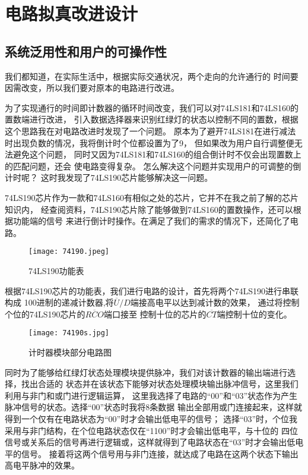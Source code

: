 \documentclass[AutoFakeBold]{LZUThesis}
\begin{document}
\chapter{电路拟真改进设计}
\section{系统泛用性和用户的可操作性}
我们都知道，在实际生活中，根据实际交通状况，两个走向的允许通行的
时间要因需改变，所以我们要对原本的电路进行改进。

为了实现通行的时间即计数器的循环时间改变，我们可以对74LS181和74LS160的置数端进行改进，
引入数据选择器来识别红绿灯的状态以控制不同的置数，根据这个思路我在对电路改进时发现了一个问题。
原本为了避开74LS181在进行减法时出现负数的情况，我将倒计时个位都设置为了9，
但如果改为用户自行调整便无法避免这个问题，
同时又因为74LS181和74LS160的组合倒计时不仅会出现置数上的匹配问题，还会
使电路变得复杂。
怎么解决这个问题并实现用户的可调整的倒计时呢？
这时我发现了74LS190芯片能够解决这一问题。

74LS190芯片作为一款和74LS160有相似之处的芯片，它并不在我之前了解的芯片知识内，
经查阅资料，74LS190芯片除了能够做到74LS160的置数操作，还可以根据功能端的信号
来进行倒计时操作。在满足了我们的需求的情况下，还简化了电路。

\begin{figure}[htbp]
    \centering
    \texttt{[image: 74190.jpeg]}
    \caption{74LS190功能表}
\end{figure}

根据74LS190芯片的功能表，我们进行电路的设计，首先将两个74LS190进行串联构成
100进制的递减计数器,将$\overline{U}/D$端接高电平以达到减计数的效果，
通过将控制个位的74LS190芯片的$\overline{RCO}$端口接至
控制十位的芯片的$\overline{CT}$端控制十位的变化。

\begin{figure}[htbp]
    \centering
    \texttt{[image: 74190s.jpg]}
    \caption{计时器模块部分电路图}
\end{figure}

同时为了能够给红绿灯状态处理模块提供脉冲，我们对该计数器的输出端进行选择，找出合适的
状态并在该状态下能够对状态处理模块输出脉冲信号，这里我们利用与非门和或门进行逻辑运算，
这里我选择了电路的“00”和“03”状态作为产生脉冲信号的状态。选择“00”状态时我将8条数据
输出全部用或门连接起来，这样就得到一个仅有在电路状态为“00”时才会输出低电平的信号；
选择“03”时，个位我采用与非门结构，在个位电路状态仅在“1100”时才会输出低电平，与十位的
四位信号或关系后的信号再进行逻辑或，这样就得到了电路状态在“03”时才会输出低电平的信号。
接着将这两个信号用与非门连接，就达成了电路在这两个状态下输出高电平脉冲的效果。
\end{document}
